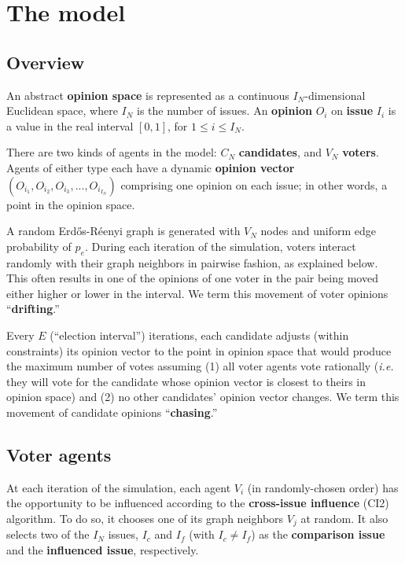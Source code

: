 \section{The model}
\label{sec:model}

\subsection{Overview}

An abstract \textbf{opinion space} is represented as a continuous
$I_N$-dimensional Euclidean space, where $I_N$ is the number of issues. An
\textbf{opinion} $O_i$ on \textbf{issue} $I_i$ is a value in the real interval
$[0,1]$, for $1 \leq i \leq I_N$.

There are two kinds of agents in the model: $C_N$ \textbf{candidates}, and
$V_N$ \textbf{voters}. Agents of either type each have a dynamic
\textbf{opinion vector} $(O_{i_1}, O_{i_2}, O_{i_3}, ..., O_{i_{I_N}})$
comprising one opinion on each issue; in other words, a point in the opinion
space.

A random Erd\H{o}s-R\'{e}enyi graph\cite{erdhos_evolution_1960} is generated
with $V_N$ nodes and uniform edge probability of $p_e$. During each iteration
of the simulation, voters interact randomly with their graph neighbors in
pairwise fashion, as explained below. This often results in one of the opinions
of one voter in the pair being moved either higher or lower in the interval.
We term this movement of voter opinions ``\textbf{drifting}.''

Every $E$ (``election interval'') iterations, each candidate adjusts (within
constraints) its opinion vector to the point in opinion space that would
produce the maximum number of votes assuming (1) all voter agents vote
rationally (\textit{i.e.} they will vote for the candidate whose opinion vector
is closest to theirs in opinion space) and (2) no other candidates' opinion
vector changes. We term this movement of candidate opinions
``\textbf{chasing}.''

\subsection{Voter agents}

At each iteration of the simulation, each agent $V_i$ (in randomly-chosen
order) has the opportunity to be influenced according to the
\textbf{cross-issue influence} (CI2) algorithm\cite{davies_agent-based_2023}.
To do so, it chooses one of its graph neighbors $V_j$ at random. It also
selects two of the $I_N$ issues, $I_c$ and $I_f$ (with $I_c \neq I_f$) as the
\textbf{comparison issue} and the \textbf{influenced issue}, respectively.


